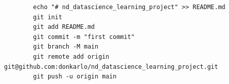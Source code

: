 \documentclass[a4paper]{article}
\title{}
\date{}
\begin{document}
    \maketitle
    \begin{verbatim}
        echo "# nd_datascience_learning_project" >> README.md
        git init
        git add README.md
        git commit -m "first commit"
        git branch -M main
        git remote add origin git@github.com:donkarlo/nd_datascience_learning_project.git
        git push -u origin main
    \end{verbatim}
\end{document}
